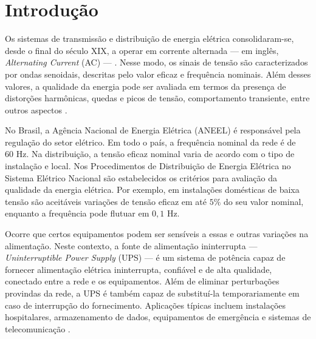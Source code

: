 \documentclass[repeatfields,oneside]{tcc}
\begin{document}
\setcounter{tocdepth}{3}
\tableofcontents


\chapter{Introdução}\label{sec:introducao}

Os sistemas de transmissão e distribuição de energia elétrica consolidaram-se, desde o final do século XIX, a operar em corrente alternada --- em inglês, \textit{Alternating Current} (AC) --- \cite{Sadiku2013}.
Nesse modo, os sinais de tensão são caracterizados por ondas senoidais, descritas pelo valor eficaz e frequência nominais.
Além desses valores, a qualidade da energia pode ser avaliada em termos da presença de distorções harmônicas, quedas e picos de tensão, comportamento transiente, entre outros aspectos \cite{Rashid2011}.

No Brasil, a Agência Nacional de Energia Elétrica (ANEEL) é responsável pela regulação do setor elétrico.
Em todo o país, a frequência nominal da rede é de $60 \text{ Hz}$.
Na distribuição, a tensão eficaz nominal varia de acordo com o tipo de instalação e local.
Nos Procedimentos de Distribuição de Energia Elétrica no Sistema Elétrico Nacional \cite{PRODIST} são estabelecidos os critérios para avaliação da qualidade da energia elétrica.
Por exemplo, em instalações domésticas de baixa tensão são aceitáveis variações de tensão eficaz em até $5\%$ do seu valor nominal, enquanto a frequência pode flutuar em $0,1 \text{ Hz}$.

Ocorre que certos equipamentos podem ser sensíveis a essas e outras variações na alimentação.
Neste contexto, a fonte de alimentação ininterrupta --- \textit{Uninterruptible Power Supply} (UPS) --- é um sistema de potência capaz de fornecer alimentação elétrica ininterrupta, confiável e de alta qualidade, conectado entre a rede e os equipamentos.
Além de eliminar perturbações provindas da rede, a UPS é também capaz de substituí-la temporariamente em caso de interrupção do fornecimento.
Aplicações típicas incluem instalações hospitalares, armazenamento de dados, equipamentos de emergência e sistemas de telecomunicação \cite{Rashid2011}.
\end{document}
